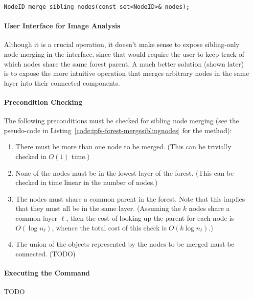 \begin{lstlisting}[style=Prototype]
NodeID merge_sibling_nodes(const set<NodeID>& nodes);
\end{lstlisting}

\paragraph{User Interface for Image Analysis}

Although it is a crucial operation, it doesn't make sense to expose sibling-only node merging in the interface, since that would require the user to keep track of which nodes share the same forest parent. A much better solution (shown later) is to expose the more intuitive operation that merges arbitrary nodes in the same layer into their connected components.

\paragraph{Precondition Checking}

The following preconditions must be checked for sibling node merging (see the pseudo-code in Listing~\ref{code:ipfs-forest-mergesiblingnodes} for the method):

\begin{enumerate}

\item There must be more than one node to be merged. (This can be trivially checked in $O(1)$ time.)
\item None of the nodes must be in the lowest layer of the forest. (This can be checked in time linear in the number of nodes.)
\item The nodes must share a common parent in the forest. Note that this implies that they must all be in the same layer. (Assuming the $k$ nodes share a common layer $\ell$, then the cost of looking up the parent for each node is $O(\log n_\ell)$, whence the total cost of this check is $O(k \log n_\ell)$.)
\item The union of the objects represented by the nodes to be merged must be connected. (TODO)

\end{enumerate}

\paragraph{Executing the Command}

TODO

